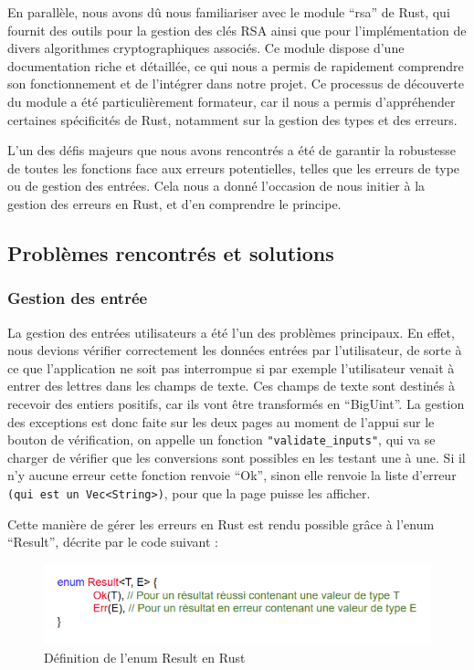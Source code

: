 \documentclass[12pt]{article} %
\begin{document}
	En parallèle, nous avons dû nous familiariser avec le module “rsa” de Rust, qui fournit des outils pour la gestion des clés RSA ainsi que pour l'implémentation de divers algorithmes cryptographiques associés. Ce module dispose d'une documentation riche et détaillée, ce qui nous a permis de rapidement comprendre son fonctionnement et de l'intégrer dans notre projet. Ce processus de découverte du module a été particulièrement formateur, car il nous a permis d'appréhender certaines spécificités de Rust, notamment sur la gestion des types et des erreurs.
	
L'un des défis majeurs que nous avons rencontrés a été de garantir la robustesse de toutes les fonctions face aux erreurs potentielles, telles que les erreurs de type ou de gestion des entrées. Cela nous a donné l'occasion de nous initier à la gestion des erreurs en Rust, et d’en comprendre le principe.


	\subsection{Problèmes rencontrés et solutions }
		\subsubsection{Gestion des entrée}
		La gestion des entrées utilisateurs a été l’un des problèmes principaux. En effet, nous devions vérifier correctement les données entrées par l’utilisateur, de sorte à ce que l’application ne soit pas interrompue si par exemple l’utilisateur venait à entrer des lettres dans les champs de texte. Ces champs de texte sont destinés à recevoir des entiers positifs, car ils vont être transformés en “BigUint”. La gestion des exceptions est donc faite sur les deux pages au moment de l'appui sur le bouton de vérification, on appelle un fonction \texttt{"validate\_inputs"}, qui va se charger de vérifier que les conversions sont possibles en les testant une à une. Si il n’y aucune erreur cette fonction renvoie “Ok”, sinon elle renvoie la liste d’erreur \texttt{(qui est un Vec<String>)}, pour que la page puisse les afficher.
		
		Cette manière de gérer les erreurs en Rust est rendu possible grâce à l'enum “Result”, décrite par le code suivant :
	
	\begin{figure}[!h]
		\begin{center}
			\includegraphics[scale=0.5]{images/enumResult}
			\caption{Définition de l'enum Result en Rust}
		\end{center}
	\end{figure}
\end{document}
